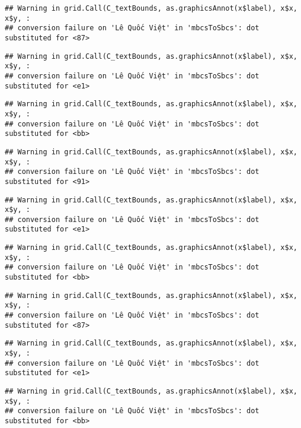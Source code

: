 \documentclass[
]{article}
\begin{document}
\begin{verbatim}
## Warning in grid.Call(C_textBounds, as.graphicsAnnot(x$label), x$x, x$y, :
## conversion failure on 'Lê Quốc Việt' in 'mbcsToSbcs': dot substituted for <87>
\end{verbatim}

\begin{verbatim}
## Warning in grid.Call(C_textBounds, as.graphicsAnnot(x$label), x$x, x$y, :
## conversion failure on 'Lê Quốc Việt' in 'mbcsToSbcs': dot substituted for <e1>
\end{verbatim}

\begin{verbatim}
## Warning in grid.Call(C_textBounds, as.graphicsAnnot(x$label), x$x, x$y, :
## conversion failure on 'Lê Quốc Việt' in 'mbcsToSbcs': dot substituted for <bb>
\end{verbatim}

\begin{verbatim}
## Warning in grid.Call(C_textBounds, as.graphicsAnnot(x$label), x$x, x$y, :
## conversion failure on 'Lê Quốc Việt' in 'mbcsToSbcs': dot substituted for <91>
\end{verbatim}

\begin{verbatim}
## Warning in grid.Call(C_textBounds, as.graphicsAnnot(x$label), x$x, x$y, :
## conversion failure on 'Lê Quốc Việt' in 'mbcsToSbcs': dot substituted for <e1>
\end{verbatim}

\begin{verbatim}
## Warning in grid.Call(C_textBounds, as.graphicsAnnot(x$label), x$x, x$y, :
## conversion failure on 'Lê Quốc Việt' in 'mbcsToSbcs': dot substituted for <bb>
\end{verbatim}

\begin{verbatim}
## Warning in grid.Call(C_textBounds, as.graphicsAnnot(x$label), x$x, x$y, :
## conversion failure on 'Lê Quốc Việt' in 'mbcsToSbcs': dot substituted for <87>
\end{verbatim}

\begin{verbatim}
## Warning in grid.Call(C_textBounds, as.graphicsAnnot(x$label), x$x, x$y, :
## conversion failure on 'Lê Quốc Việt' in 'mbcsToSbcs': dot substituted for <e1>
\end{verbatim}

\begin{verbatim}
## Warning in grid.Call(C_textBounds, as.graphicsAnnot(x$label), x$x, x$y, :
## conversion failure on 'Lê Quốc Việt' in 'mbcsToSbcs': dot substituted for <bb>
\end{verbatim}
\end{document}
